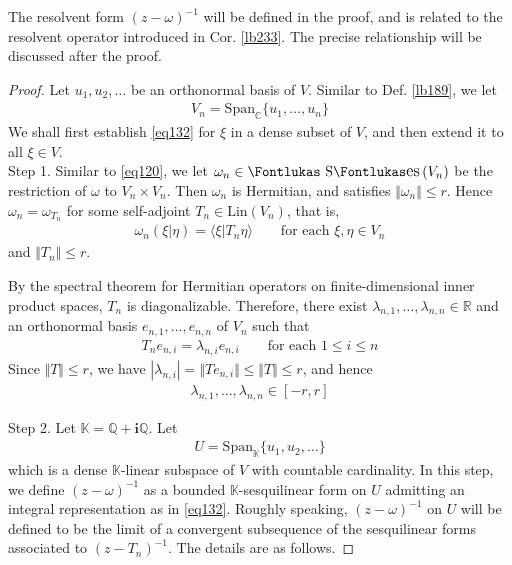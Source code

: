\documentclass[12pt,b5paper,notitlepage]{article}
\theoremstyle{definition}
\theoremstyle{plain}
\DeclareMathOperator{\Ses}{\text{\Fontlukas S}\text{\kern -0pt {\Fontlukas\large es}}\,}
\newcommand{\Span}{\mathrm{Span}}
\newcommand{\bk}[1]{\langle {#1}\rangle}
\newcommand{\im}{\mathbf{i}}
\newcommand{\Kbb}{\mathbb K}
\newcommand{\Cbb}{\mathbb C}
\newcommand{\Qbb}{\mathbb Q}
\newcommand{\Rbb}{\mathbb R}
\newcommand{\Lin}{\mathrm{Lin}}
\numberwithin{equation}{section}
\begin{document}
The resolvent form $(z-\omega)^{-1}$ will be defined in the proof, and is related to the resolvent operator introduced in Cor. \ref{lb233}. The precise relationship will be discussed after the proof.


\begin{proof}
Let $u_1,u_2,\dots$ be an orthonormal basis of $V$. Similar to Def. \ref{lb189}, we let
\begin{align*}
V_n=\Span_\Cbb\{u_1,\dots,u_n\}
\end{align*}
We shall first establish \eqref{eq132} for $\xi$ in a dense subset of $V$, and then extend it to all $\xi\in V$.\\[-1ex]



Step 1. Similar to \eqref{eq120}, we let $\omega_n\in\Ses(V_n)$ be the restriction of $\omega$ to $V_n\times V_n$. Then $\omega_n$ is Hermitian, and satisfies $\Vert\omega_n\Vert\leq r$. Hence $\omega_n=\omega_{T_n}$ for some self-adjoint $T_n\in\Lin(V_n)$, that is,
\begin{align*}
\omega_n(\xi|\eta)=\bk{\xi|T_n\eta}\qquad\text{for each }\xi,\eta\in V_n
\end{align*}
and $\Vert T_n\Vert\leq r$.

By the spectral theorem for Hermitian operators on finite-dimensional inner product spaces, $T_n$ is diagonalizable. Therefore, there exist $\lambda_{n,1},\dots,\lambda_{n,n}\in\Rbb$ and an orthonormal basis $e_{n,1},\dots,e_{n,n}$ of $V_n$ such that
\begin{align*}
T_ne_{n,i}=\lambda_{n,i}e_{n,i}\qquad\text{for each }1\leq i\leq n
\end{align*}
Since $\Vert T\Vert\leq r$, we have $|\lambda_{n,i}|=\Vert Te_{n,i}\Vert\leq\Vert T\Vert\leq r$, and hence
\begin{align*}
\lambda_{n,1},\dots,\lambda_{n,n}\in [-r,r]
\end{align*}


Step 2. Let $\Kbb=\Qbb+\im\Qbb$. Let
\begin{align*}
U=\Span_\Kbb\{u_1,u_2,\dots\}
\end{align*}
which is a dense $\Kbb$-linear subspace of $V$ with countable cardinality. In this step, we define $(z-\omega)^{-1}$ as a bounded $\Kbb$-sesquilinear form on $U$ admitting an integral representation as in \eqref{eq132}. Roughly speaking, $(z-\omega)^{-1}$ on $U$ will be defined to be the limit of a convergent subsequence of the sesquilinear forms associated to $(z-T_n)^{-1}$. The details are as follows.


\end{proof}
\end{document}
